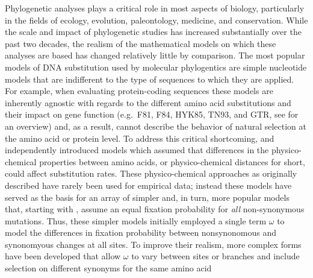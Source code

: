 \documentclass[12pt,letterpaper]{article}
\renewcommand{\subsection}[1]{%
\bigskip
\begin{center}
\begin{large}
\normalfont\itshape #1
\end{large}
\end{center}}
\newcommand{\PC}{physico-chemical\xspace}
\begin{document}
Phylogenetic analyses plays a critical role in most aspects of biology, particularly in the fields of ecology, evolution, paleontology, medicine, and conservation.
While the scale and impact of phylogenetic studies has increased substantially over the past two decades, the realism of the mathematical models on which these analyses are based has changed relatively little by comparison.
The most popular models of DNA substitution used by molecular phylogentics are simple nucleotide models that are indifferent to the type of sequences to which they are applied.
For example, when evaluating protein-coding sequences these models are inherently agnostic with regards to the different amino acid substitutions and their impact on gene function (e.g.~F81, F84, HYK85, TN93, and GTR, see \citet{Yang2014} for an overview) and, as a result, cannot describe the behavior of natural selection at the amino acid or protein level.
To address this critical shortcoming, \citet{GoldmanAndYang1994} and \citet{MuseAndGaut1994} independently introduced models which assumed that differences in the \PC properties between amino acids, or \PC distances for short, could affect substitution rates. 
These \PC approaches as originally described have rarely been used for empirical data; instead these models have served as the basis for an array of simpler and, in turn, more popular models that, starting with \citep{YangAndNielsen1998,NielsenAndYang1998}, assume an equal fixation probability for \emph{all} non-synonymous mutations.
Thus, these simpler models initially employed a single term $\omega$ to model the differences in fixation probability between nonsynonomous and synonomyous changes at all sites.
To improve their realism, more complex forms have been developed that allow $\omega$ to vary between sites or branches \citep[as cited in ][]{Anisimova2012} and include selection on different synonyms for the same amino acid \cite[e.g.][]{YangAndNielsen2008} %
\end{document}
